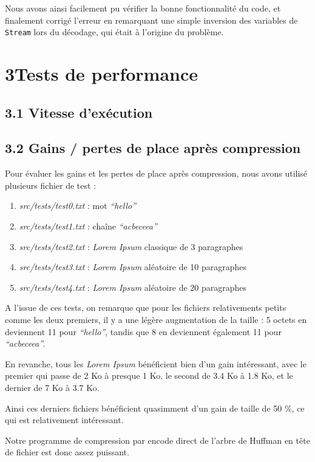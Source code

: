 \documentclass [a4paper,11pt] {report}
\begin{document}
Nous avons ainsi facilement pu vérifier la bonne fonctionnalité du code, et finalement corrigé l'erreur en remarquant une simple inversion des variables de \lstinline!Stream! lors du décodage, qui était à l'origine du problème.


\section* {3\hspace{5mm}Tests de performance }

\subsection* {3.1\hspace{3mm} Vitesse d'exécution}



\subsection* {3.2\hspace{3mm} Gains / pertes de place après compression}

Pour évaluer les gains et les pertes de place après compression, nous avons utilisé plusieurs fichier de test :

\begin{enumerate}

\item%
\textit{src/tests/test0.txt} : mot \textit{``hello''}

\item%
\textit{src/tests/test1.txt} : chaîne \textit{``acbeceea''}

\item%
\textit{src/tests/test2.txt} : \textit{Lorem Ipsum} classique de 3 paragraphes

\item%
\textit{src/tests/test3.txt} : \textit{Lorem Ipsum} aléatoire de 10 paragraphes

\item%
\textit{src/tests/test4.txt} : \textit{Lorem Ipsum} aléatoire de 20 paragraphes

\end{enumerate}


A l'issue de ces tests, on remarque que pour les fichiers relativements petits comme les deux premiers, il y a une légère augmentation de la taille : 5 octets en deviennent 11 pour \textit{``hello''}, tandis que 8 en deviennent également 11 pour \textit{``acbeceea''}.

En revanche, tous les \textit{Lorem Ipsum} bénéficient bien d'un gain intéressant, avec le premier qui passe de 2 Ko à presque 1 Ko, le second de 3.4 Ko à 1.8 Ko, et le dernier de 7 Ko à 3.7 Ko.

Ainsi ces derniers fichiers bénéficient quasimment d'un gain de taille de 50 \%, ce qui est relativement intéressant.

Notre programme de compression par encode direct de l'arbre de Huffman en tête de fichier est donc assez puissant.
\end{document}
